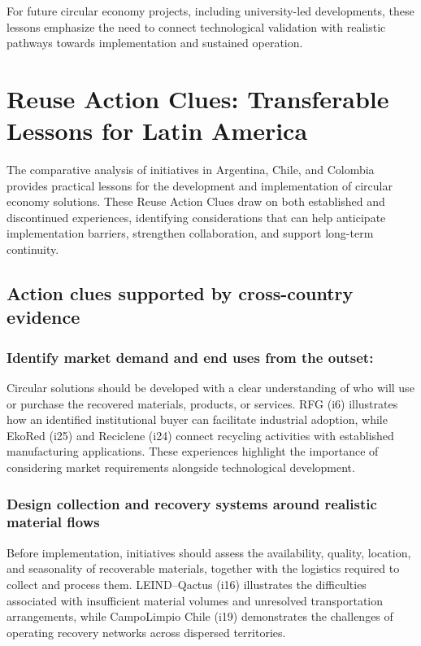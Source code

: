 \documentclass[
  12pt,
  oneside]{book}
\begin{document}
For future circular economy projects, including university-led
developments, these lessons emphasize the need to connect technological
validation with realistic pathways towards implementation and sustained
operation.

\section{Reuse Action Clues: Transferable Lessons for Latin
America}\label{reuse-action-clues-transferable-lessons-for-latin-america}

The comparative analysis of initiatives in Argentina, Chile, and
Colombia provides practical lessons for the development and
implementation of circular economy solutions. These Reuse Action Clues
draw on both established and discontinued experiences, identifying
considerations that can help anticipate implementation barriers,
strengthen collaboration, and support long-term continuity.

\subsection{Action clues supported by cross-country
evidence}\label{action-clues-supported-by-cross-country-evidence}

\subsubsection{Identify market demand and end uses from the
outset:}\label{identify-market-demand-and-end-uses-from-the-outset}

Circular solutions should be developed with a clear understanding of who
will use or purchase the recovered materials, products, or services. RFG
(i6) illustrates how an identified institutional buyer can facilitate
industrial adoption, while EkoRed (i25) and Reciclene (i24) connect
recycling activities with established manufacturing applications. These
experiences highlight the importance of considering market requirements
alongside technological development.

\subsubsection{Design collection and recovery systems around realistic
material
flows}\label{design-collection-and-recovery-systems-around-realistic-material-flows}

Before implementation, initiatives should assess the availability,
quality, location, and seasonality of recoverable materials, together
with the logistics required to collect and process them. LEIND--Qactus
(i16) illustrates the difficulties associated with insufficient material
volumes and unresolved transportation arrangements, while CampoLimpio
Chile (i19) demonstrates the challenges of operating recovery networks
across dispersed territories.
\end{document}
